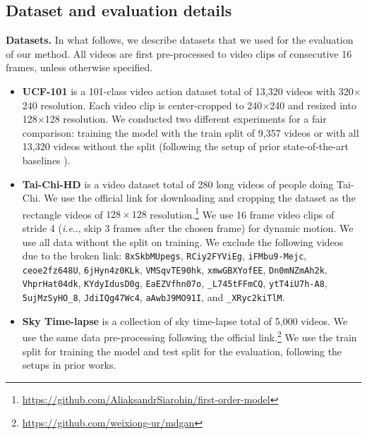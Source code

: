\documentclass{article} \usepackage{iclr2022_conference,times}
\makeatletter
\DeclareRobustCommand\onedot{\futurelet\@let@token\@onedot}
\def\@onedot{\ifx\@let@token.\else.\null\fi\xspace}
\def\ie{\emph{i.e}\onedot} \def\Ie{\emph{I.e}\onedot}
\makeatother
\begin{document}
\subsection{Dataset and evaluation details}
\label{appen:details-eval}

\textbf{Datasets.}
In what follows, we describe datasets that we used for the evaluation of our method. All videos are first pre-processed to video clips of consecutive 16 frames, unless otherwise specified.
\begin{itemize}[leftmargin=0.2in]
\item \textbf{UCF-101} \citep{soomro2012ucf101} is a 101-class video action dataset total of 13,320 videos with 320$\times$240 resolution. Each video clip is center-cropped to 240$\times$240 and resized into 128$\times$128 resolution. We conducted two different experiments for a fair comparison: training the model with the train split of 9,357 videos or with all 13,320 videos without the split (following the setup of prior state-of-the-art baselines \citep{clark2019adversarial, tian2021good}).

\item \textbf{Tai-Chi-HD} \citep{siarohin2019first} is a video dataset total of 280 long videos of people doing Tai-Chi. We use the official link for downloading and cropping the dataset as the rectangle videos of $128\times128$ resolution.\footnote{\url{https://github.com/AliaksandrSiarohin/first-order-model}} We use 16 frame video clips of stride 4 (\ie, skip 3 frames after the chosen frame) for dynamic motion. We use all data without the split on training. We exclude the following videos due to the broken link: \texttt{8xSkbMUpegs}, \texttt{RCiy2FYViEg}, \texttt{iFMbu9-Mejc}, \texttt{ceoe2fz648U}, \texttt{6jHyn4z0KLk}, \texttt{VMSqvTE90hk}, \texttt{xmwGBXYofEE}, \texttt{Dn0mNZmAh2k}, \texttt{VhprHat04dk}, \texttt{KYdyIdusD0g}, \texttt{EaEZVfhn07o}, \texttt{\_L745tFFmCQ}, \texttt{ytT4iU7h-A8}, \texttt{5ujMzSyHO\_8}, \texttt{JdiIQg47Wc4}, \texttt{aAwbJ9MO91I}, and \texttt{\_XRyc2kiTlM}.

\item \textbf{Sky Time-lapse} \citep{xiong2018learning} is a collection of sky time-lapse total of 5,000 videos. We use the same data pre-processing following the official link.\footnote{\url{https://github.com/weixiong-ur/mdgan}} We use the train split for training the model and test split for the evaluation, following the setups in prior works.


\end{itemize}
\end{document}
